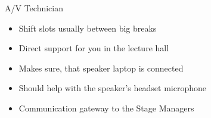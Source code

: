 
\begin{frame}{A/V Technician}
	\begin{itemize}
		\item Shift slots usually between big breaks
		\item Direct support for you in the lecture hall
		\item Makes sure, that speaker laptop is connected
		\item Should help with the speaker's headset microphone
		\item Communication gateway to the Stage Managers
	\end{itemize}
\end{frame}
